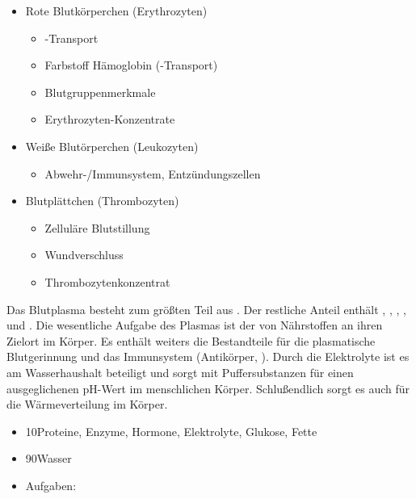 {
\begin{itemize}
  \item Rote Blutkörperchen (Erythrozyten)
  \begin{itemize}
    \item {}-Transport
    \item Farbstoff Hämoglobin (-Transport)
    \item Blutgruppenmerkmale
    \item Erythrozyten-Konzentrate
  \end{itemize}
  \item Weiße Blutörperchen (Leukozyten)
  \begin{itemize}
    \item Abwehr-/Immunsystem, Entzündungszellen
  \end{itemize}
  \item Blutplättchen (Thrombozyten)
  \begin{itemize}
    \item Zelluläre Blutstillung
    \item Wundverschluss
    \item Thrombozytenkonzentrat
  \end{itemize}
\end{itemize}
}{}{}{}





{%
%
Das Blutplasma besteht zum größten Teil aus . Der
restliche Anteil enthält , ,
, ,  und .
Die wesentliche Aufgabe des Plasmas ist der 
von Nährstoffen an ihren Zielort im Körper. Es enthält
weiters die Bestandteile für die plasmatische Blutgerinnung
und das Immunsystem (Antikörper, ). Durch
die Elektrolyte ist es am Wasserhaushalt beteiligt und sorgt
mit Puffersubstanzen für einen ausgeglichenen pH-Wert im
menschlichen Körper.
Schlußendlich sorgt es auch für die Wärmeverteilung im
Körper.
}
{
\begin{itemize}
    \item 10\PC* Proteine, Enzyme, Hormone, Elektrolyte,
    Glukose, Fette
    \item 90\PC* Wasser
    \item Aufgaben:
\end{itemize}
}{}{}{}

